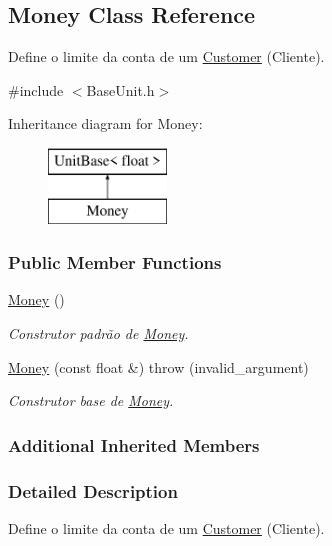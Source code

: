 \hypertarget{classMoney}{\subsection{Money Class Reference}
\label{d7/d9a/classMoney}
}


Define o limite da conta de um \hyperlink{classCustomer}{Customer} (Cliente).  




{\ttfamily \#include $<$Base\-Unit.\-h$>$}

Inheritance diagram for Money\-:\begin{figure}[H]
\begin{center}
\leavevmode
\includegraphics[height=2.000000cm]{d7/d9a/classMoney}
\end{center}
\end{figure}
\subsubsection*{Public Member Functions}
\begin{DoxyCompactItemize}
\item 
\hyperlink{classMoney_a883c32ea0f71c9d1422141c384d225ba}{Money} ()
\begin{DoxyCompactList}\small\item\em Construtor padrão de \hyperlink{classMoney}{Money}. \end{DoxyCompactList}\item 
\hyperlink{classMoney_a33986736e7432883ebd61584815b6681}{Money} (const float \&)  throw (invalid\-\_\-argument)
\begin{DoxyCompactList}\small\item\em Construtor base de \hyperlink{classMoney}{Money}. \end{DoxyCompactList}\end{DoxyCompactItemize}
\subsubsection*{Additional Inherited Members}


\subsubsection{Detailed Description}
Define o limite da conta de um \hyperlink{classCustomer}{Customer} (Cliente). 

